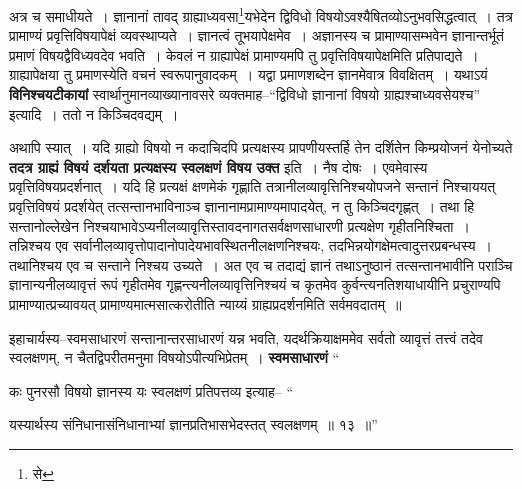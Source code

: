 \documentclass[article,12pt,a4paper]{memoir}
\begin{document}
	  \pstart अत्र च समाधीयते । ज्ञानानां तावद् ग्राह्याध्यवसा\footnote{से}यभेदेन द्विविधो विषयोऽवश्यैषितव्योऽनुभवसिद्धत्वात् । तत्र प्रामाण्यं प्रवृत्तिविषयापेक्षं व्यवस्थाप्यते । ज्ञानत्वं तूभयापेक्षमेव । अज्ञानस्य च प्रामाण्यासम्भवेन ज्ञानान्तर्भूतं प्रमाणं विषयद्वैविध्यवदेव भवति । केवलं न ग्राह्यापे\leavevmode{}क्षं प्रामाण्यमपि तु प्रवृत्तिविषयापेक्षमिति प्रतिपाद्यते । ग्राह्यापेक्षया तु प्रमाणस्येति वचनं स्वरूपानुवादकम् । यद्वा प्रमाणशब्देन ज्ञानमेवात्र विवक्षितम् । यथाऽयं \textbf{विनिश्चयटीकायां} स्वार्थानुमानव्याख्यानावसरे व्यक्तमाह--“द्विविधो ज्ञानानां विषयो ग्राह्यश्चाध्यवसेयश्च” इत्यादि । ततो न किञ्चिदवद्यम् ।
	\pend
      

	  \pstart अथापि स्यात् । यदि ग्राह्यो विषयो न कदाचिदपि प्रत्यक्षस्य प्रापणीयस्तर्हि तेन दर्शितेन किम्प्रयोजनं येनोच्यते \textbf{तदत्र ग्राह्यं विषयं दर्शयता प्रत्यक्षस्य स्वलक्षणं विषय उक्त} इति । नैष दोषः । एवमेवास्य प्रवृत्तिविषयप्रदर्शनात् । यदि हि प्रत्यक्षं क्षणमेकं गृह्णाति तत्रानीलव्यावृत्तिनिश्चयोपजने सन्तानं निश्चाययत् प्रवृत्तिविषयं प्रदर्शयेत् तत्सन्तानभाविनाञ्च ज्ञानानामप्रामाण्यमापादयेत्, न तु किञ्चिदगृह्णत् । तथा हि सन्तानोल्लेखेन निश्चयाभावेऽप्यनीलव्यावृत्तिस्तावदनागतसर्वक्षणसाधारणी प्रत्यक्षेण गृहीतनिश्चिता । तन्निश्चय एव सर्वानीलव्यावृत्तोपादानोपादेयभावस्थितनीलक्षणनिश्चयः, तदभिन्नयोगक्षेमत्वादुत्तरप्रबन्धस्य । तथानिश्चय एव च सन्ताने निश्चय उच्यते । अत एव च तदाद्यं ज्ञानं तथाऽनुष्ठानं तत्सन्तानभावीनि पराञ्चि ज्ञानान्यनीलव्यावृत्तं रूपं गृहीतमेव गृह्णन्त्यनीलव्यावृत्तिनिश्चयं च कृतमेव कुर्वन्त्यनतिशयाधायीनि प्रचुराण्यपि प्रामाण्यात्प्रच्यावयत् प्रामाण्यमात्मसात्करोतीति न्याय्यं ग्राह्यप्रदर्शनमिति सर्वमवदातम् ॥
	\pend
      

	  \pstart इहाचार्यस्य--स्वमसाधारणं सन्तानान्तरसाधारणं यन्न भवति, यदर्थक्रियाक्षममेव सर्वतो व्यावृत्तं तत्त्वं तदेव स्वलक्षणम्, न चैतद्विपरीतमनुमा विषयोऽपीत्यभिप्रेतम् । \textbf{स्वमसाधारणं} \leavevmode{} “
	  
	कः पुनरसौ विषयो ज्ञानस्य यः स्वलक्षणं प्रतिपत्तव्य इत्याह-- “
	  
	यस्यार्थस्य संनिधानासंनिधानाभ्यां ज्ञानप्रतिभासभेदस्तत् स्वलक्षणम् ॥ १३ ॥” 
	  
\end{document}
